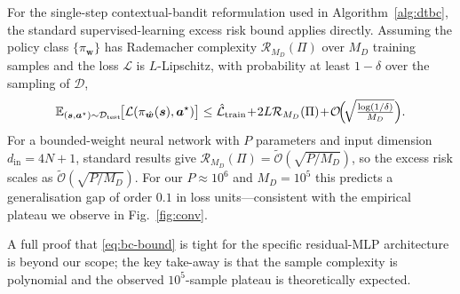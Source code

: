 \documentclass[journal]{IEEEtran}
\newcommand{\vect}[1]{\bm{#1}}
\newcommand{\E}{\mathbb{E}}
\newcommand{\Loss}{\mathcal{L}}
\begin{document}
For the single-step contextual-bandit reformulation used in
Algorithm~\ref{alg:dtbc}, the standard supervised-learning excess
risk bound \cite{shalev2014understanding} applies directly.
Assuming the policy class $\{\pi_{\vect{w}}\}$ has
Rademacher complexity $\mathcal{R}_{M_D}(\Pi)$ over $M_D$ training
samples and the loss $\Loss$ is $L$-Lipschitz, with probability at
least $1-\delta$ over the sampling of $\mathcal{D}$,
\begin{equation}
  \E_{(\vect{s},\vect{a}^{\star})\sim\mathcal{D}_{\mathrm{test}}}\!\bigl[\Loss(\pi_{\hat{\vect{w}}}(\vect{s}),\vect{a}^{\star})\bigr]
  \le \hat{\Loss}_{\mathrm{train}}\!+\!2L\mathcal{R}_{M_D}(\Pi)\!+\!\mathcal{O}\!\Bigl(\!\sqrt{\tfrac{\log(1/\delta)}{M_D}}\Bigr).
  \label{eq:bc-bound}
\end{equation}
For a bounded-weight neural network with $P$ parameters and
input dimension $d_{\mathrm{in}}\!=\!4N+1$, standard results give
$\mathcal{R}_{M_D}(\Pi)\!=\!\widetilde{\mathcal{O}}(\sqrt{P/M_D})$,
so the excess risk scales as
$\widetilde{\mathcal{O}}(\sqrt{P/M_D})$. For our $P\!\approx\!10^{6}$
and $M_D\!=\!10^{5}$ this predicts a generalisation gap of order
$0.1$ in loss units---consistent with the empirical plateau we
observe in Fig.~\ref{fig:conv}.

A full proof that \eqref{eq:bc-bound} is tight for the specific
residual-MLP architecture is beyond our scope; the key take-away
is that the sample complexity is polynomial and the observed
$10^{5}$-sample plateau is theoretically expected.



\end{document}
